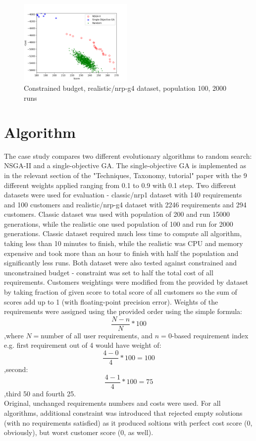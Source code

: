 \documentclass[12pt]{article}
\begin{document}
\begin{figure}[H]
  \centering
  \includegraphics[width=0.49\textwidth]{realistic_constraint}
  \caption{Constrained budget, realistic/nrp-g4 dataset, population 100, 2000 runs}
  \label{fig:4}
\end{figure}

\section{Algorithm}
The case study compares two different evolutionary algorithms to random search: NSGA-II and a single-objective GA. The single-objective GA is implemented as in the relevant section of the "Techniques, Taxonomy, tutorial" paper with the 9 different weights applied ranging from 0.1 to 0.9 with 0.1 step. Two different datasets were used for evaluation - classic/nrp1 dataset with 140 requirements and 100 customers and realistic/nrp-g4 dataset with 2246 requirements and 294 customers. Classic dataset was used with population of 200 and run 15000 generations, while the realistic one used population of 100 and run for 2000 generations. Classic dataset required much less time to compute all algorithm, taking less than 10 minutes to finish, while the realistic was CPU and memory expensive and took more than an hour to finish with half the population and significantly less runs. Both dataset were also tested against constrained and unconstrained budget - constraint was set to half the total cost of all requirements. Customers weightings were modified from the provided by dataset by taking fraction of given score to total score of all customers so the sum of scores add up to 1 (with floating-point precision error).
\newpage
Weights of the requirements were assigned using the provided order using the simple formula:
\[ \frac{N-n}{N} * 100 \]
,where \(N = \)number of all user requirements, and \( n = \)0-based requirement index e.g. first requirement out of 4 would have weight of:
\[ \frac{4-0}{4} * 100 = 100 \]
,second:
\[ \frac{4-1}{4} * 100 = 75 \]
,third 50 and fourth 25. \\
Original, unchanged requirements numbers and costs were used. For all algorithms, additional constraint was introduced that rejected empty solutions (with no requirements satisfied) as it produced soltions with perfect cost score (0, obviously), but worst customer score (0, as well).
\end{document}
